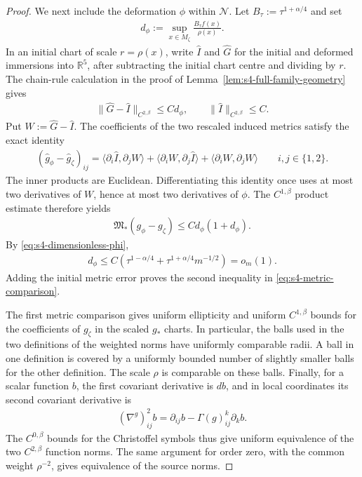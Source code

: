 \documentclass[a4paper,11pt,oneside,reqno]{amsart}
\numberwithin{equation}{section}
\theoremstyle{definition}
\begin{document}
\begin{proof}
    We next include the deformation $\phi$ within
    $\mathcal N$. Let $B_\tau:=\tau^{1+\alpha/4}$ and set
    \begin{align*}
        d_\phi:=\sup_{x\in M_\zeta}
        \frac{B_\tau f(x)}{\rho(x)}.
    \end{align*}
    In an initial chart of scale $r=\rho(x)$, write
    $\widehat I$ and $\widehat G$ for the initial and
    deformed immersions into $\mathbb R^5$, after subtracting
    the initial chart centre and dividing by $r$.
    The chain-rule calculation in the proof of
    Lemma~\ref{lem:s4-full-family-geometry} gives
    \begin{align*}
        \|\widehat G-\widehat I\|_{C^{2,\beta}}
        \leq Cd_\phi,
        \qquad
        \|\widehat I\|_{C^{2,\beta}}\leq C.
    \end{align*}
    Put $W:=\widehat G-\widehat I$. The coefficients of
    the two rescaled induced metrics satisfy the exact identity
    \begin{align*}
        (\widehat g_\phi-\widehat g_\zeta)_{ij}
        =\langle\partial_i\widehat I,\partial_jW\rangle
        +\langle\partial_iW,\partial_j\widehat I\rangle
        +\langle\partial_iW,\partial_jW\rangle
        \qquad i,j\in\{1,2\}.
    \end{align*}
    The inner products are Euclidean. Differentiating
    this identity once uses at most two derivatives of
    $W$, hence at most two derivatives of $\phi$.
    The $C^{1,\beta}$ product estimate therefore yields
    \begin{align*}
        \mathfrak M_*(g_\phi-g_\zeta)
        \leq Cd_\phi(1+d_\phi).
    \end{align*}
    By \eqref{eq:s4-dimensionless-phi},
    \begin{align*}
        d_\phi
        \leq C\left(\tau^{1-\alpha/4}
        +\tau^{1+\alpha/4}m^{-1/2}\right)=o_m(1).
    \end{align*}
    Adding the initial metric error proves the second
    inequality in \eqref{eq:s4-metric-comparison}.

    The first metric comparison gives uniform ellipticity
    and uniform $C^{1,\beta}$ bounds for the coefficients
    of $g_\zeta$ in the scaled $g_*$ charts. In particular,
    the balls used in the two definitions of the weighted
    norms have uniformly comparable radii. A ball in one
    definition is covered by a uniformly bounded number
    of slightly smaller balls for the other definition.
    The scale $\rho$ is comparable on these balls.
    Finally, for a scalar function $b$, the first covariant
    derivative is $db$, and in local coordinates its
    second covariant derivative is
    \begin{align*}
        (\nabla^g)^2_{ij}b
        =\partial_{ij}b-\Gamma(g)^k_{ij}\partial_kb.
    \end{align*}
    The $C^{0,\beta}$ bounds for the Christoffel symbols
    thus give uniform equivalence of the two
    $C^{2,\beta}$ function norms. The same argument for
    order zero, with the common weight $\rho^{-2}$,
    gives equivalence of the source norms.


\end{proof}
\end{document}
